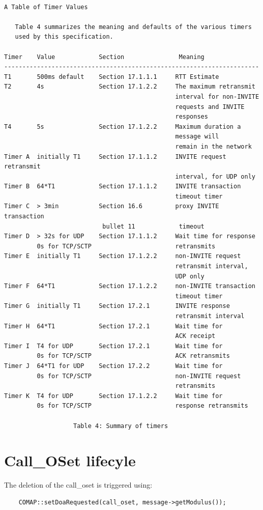 \documentclass[a4paper]{article}
\begin{document}
\begin{verbatim}

A Table of Timer Values

   Table 4 summarizes the meaning and defaults of the various timers
   used by this specification.

Timer    Value            Section               Meaning
----------------------------------------------------------------------
T1       500ms default    Section 17.1.1.1     RTT Estimate
T2       4s               Section 17.1.2.2     The maximum retransmit
                                               interval for non-INVITE
                                               requests and INVITE
                                               responses
T4       5s               Section 17.1.2.2     Maximum duration a
                                               message will
                                               remain in the network
Timer A  initially T1     Section 17.1.1.2     INVITE request retransmit
                                               interval, for UDP only
Timer B  64*T1            Section 17.1.1.2     INVITE transaction
                                               timeout timer
Timer C  > 3min           Section 16.6         proxy INVITE transaction
                           bullet 11            timeout
Timer D  > 32s for UDP    Section 17.1.1.2     Wait time for response
         0s for TCP/SCTP                       retransmits
Timer E  initially T1     Section 17.1.2.2     non-INVITE request
                                               retransmit interval,
                                               UDP only
Timer F  64*T1            Section 17.1.2.2     non-INVITE transaction
                                               timeout timer
Timer G  initially T1     Section 17.2.1       INVITE response
                                               retransmit interval
Timer H  64*T1            Section 17.2.1       Wait time for
                                               ACK receipt
Timer I  T4 for UDP       Section 17.2.1       Wait time for
         0s for TCP/SCTP                       ACK retransmits
Timer J  64*T1 for UDP    Section 17.2.2       Wait time for
         0s for TCP/SCTP                       non-INVITE request
                                               retransmits
Timer K  T4 for UDP       Section 17.1.2.2     Wait time for
         0s for TCP/SCTP                       response retransmits

                   Table 4: Summary of timers

\end{verbatim}

\section{Call\_OSet lifecyle}

The deletion of the call\_oset is triggered using:
\begin{verbatim}
	COMAP::setDoaRequested(call_oset, message->getModulus());
\end{verbatim} 
\end{document}
